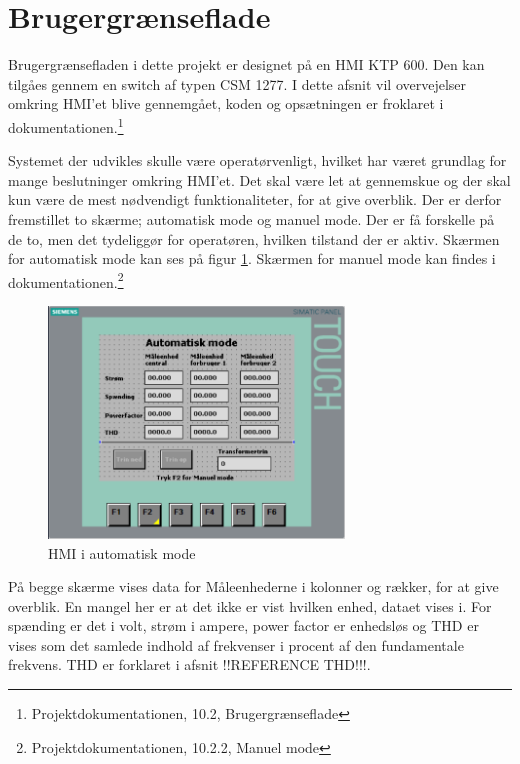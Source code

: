 

\section{Brugergrænseflade}

Brugergrænsefladen i dette projekt er designet på en HMI KTP 600. Den kan tilgåes gennem en switch af typen CSM 1277. I dette afsnit vil overvejelser omkring HMI'et blive gennemgået, koden og opsætningen er froklaret i dokumentationen.\footnote{Projektdokumentationen, 10.2, Brugergrænseflade}


Systemet der udvikles skulle være operatørvenligt, hvilket har været grundlag for mange beslutninger omkring HMI'et. Det skal være let at gennemskue og der skal kun være de mest nødvendigt funktionaliteter, for at give overblik.
Der er derfor fremstillet to skærme; automatisk mode og manuel mode. Der er få forskelle på de to, men det tydeliggør for operatøren, hvilken tilstand der er aktiv. Skærmen for automatisk mode kan ses på figur \ref{fig:HMIAutomatiskModeDesign}. Skærmen for manuel mode kan findes i dokumentationen.\footnote{Projektdokumentationen, 10.2.2, Manuel mode}

\begin{figure}[H] %
	\centering
	\includegraphics[width=0.7\textwidth]{Figure/HMIAutomatiskModeDesign}
	\caption{HMI i automatisk mode}
	\label{fig:HMIAutomatiskModeDesign}
\end{figure}

På begge skærme vises data for Måleenhederne i kolonner og rækker, for at give overblik. En mangel her er at det ikke er vist hvilken enhed, dataet vises i. For spænding er det i volt, strøm i ampere, power factor er enhedsløs og THD er vises som det samlede indhold af frekvenser i procent af den fundamentale frekvens. THD er forklaret i afsnit !!REFERENCE THD!!!.


